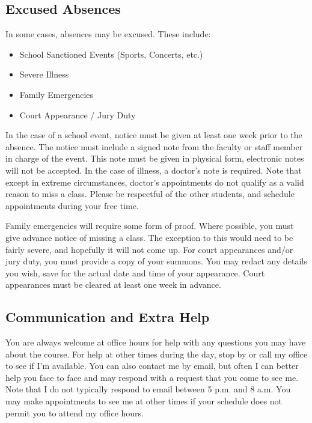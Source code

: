 \documentclass[11pt]{article}
\begin{document}
\subsection*{Excused Absences}
In some cases, absences may be excused. These include:
\begin{itemize}
    \item School Sanctioned Events (Sports, Concerts, etc.)
    \item Severe Illness
    \item Family Emergencies
    \item Court Appearance / Jury Duty
\end{itemize}
In the case of a school event, notice must be given at least one week
prior to the absence. The notice must include a signed note from the
faculty or staff member in charge of the event. This note must be
given in physical form, electronic notes will not be accepted.
In the case of illness, a doctor's note is required. Note that
except in extreme circumstances, doctor's appointments do not qualify as a valid reason to miss
a class. Please be respectful of the other students, and schedule
appointments during your free time.

Family emergencies will require some form of proof. Where possible,
you must give advance notice of missing a class. The exception to this
would need to be fairly severe, and hopefully it will not come up.
For court appearances and/or jury duty, you must provide a copy of
your summons. You may redact any details you wish, save for the
actual date and time of your appearance. Court appearances must be
cleared at least one week in advance.

\subsection*{Communication and Extra Help}
You are always welcome at office hours for help with any
questions you may have about the course. For help at other times during the day, stop by or call my office to see if I'm available. You can also contact me by email, but often I can better help you face to face and may respond with a request that
you come to see me. Note that I do not typically respond to email between 5 p.m. and 8 a.m. You may make appointments to see me at other times if your schedule does not permit you to attend my office hours.
\end{document}
